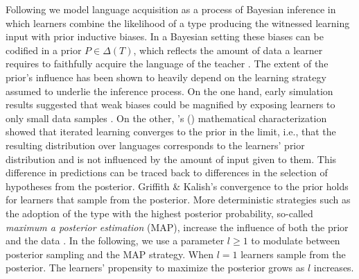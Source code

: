 \documentclass[a4paper, 11pt]{article}
\theoremstyle{Satz}
\newcommand{\citeposs}[2][]{\citeauthor{#2}'s (\citeyear[#1]{#2})}
\begin{document}
Following \citet{griffiths+kalish:2007} we model language acquisition as a process of Bayesian
inference in which learners combine the likelihood of a type producing the witnessed learning
input with prior inductive biases. In a Bayesian setting these biases can be codified in a prior
$P \in \Delta(T)$, which reflects the amount of data a learner requires to faithfully acquire
the language of the teacher \citep[cf.][450]{griffiths+kalish:2007}. The extent of the prior's
influence has been shown to heavily depend on the learning strategy assumed to underlie the
inference process. On the one hand, early simulation results suggested that weak biases could
be magnified by exposing learners to only small data samples
\citep[e.g. in][]{brighton:2002}. On the other, \citeposs{griffiths+kalish:2007} mathematical
characterization showed that iterated learning converges to the prior in the limit, i.e., that
the resulting distribution over languages corresponds to the learners' prior distribution and
is not influenced by the amount of input given to them. This difference in predictions can be
traced back to differences in the selection of hypotheses from the posterior. Griffith \&
Kalish's convergence to the prior holds for learners that sample from the posterior. More
deterministic strategies such as the adoption of the type with the highest posterior
probability, so-called {\it maximum a posterior estimation} (MAP), increase the influence of
both the prior and the data \citep{griffiths+kalish:2007,kirby+etal:2007}. In the following, we
use a parameter $l\ge1$ to modulate between posterior sampling and the MAP strategy. When
$l = 1$ learners sample from the posterior. The learners' propensity to maximize the posterior
grows as $l$ increases.
\end{document}
